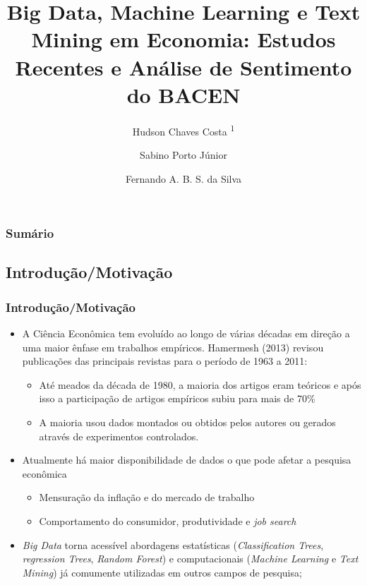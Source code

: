 \documentclass[aspectratio=169]{beamer}
\title[\sc{XVIII EBFin}]{Big Data, Machine Learning e Text Mining em Economia: Estudos Recentes e Análise de Sentimento do BACEN}
\author[FECAP]{Hudson Chaves Costa \textsuperscript{1} \and Sabino Porto Júnior \inst{2} \and Fernando A. B. S. da Silva \inst{3}}
\institute[]{\textsuperscript{1} IBMEC - MG \and \inst{2} Faculdade de Ciências Econômicas - UFRGS \and \inst{3} Instituto de Matemática e Estatística - UFRGS}
\date{}
\begin{document}


\begin{frame}
  \titlepage
\end{frame}

\begin{frame}[plain]\frametitle{Sumário}
\small\tableofcontents
\end{frame}



\subsection{Introdução/Motivação}

\begin{frame}\frametitle{Introdução/Motivação}
  \begin{itemize}
  \item A Ciência Econômica tem evoluído ao longo de várias décadas em direção a uma maior ênfase em trabalhos empíricos. Hamermesh (2013) revisou publicações das principais revistas para o período de 1963 a 2011:
    \begin{itemize}
      \item Até meados da década de 1980, a maioria dos artigos eram teóricos e após isso a participação de artigos empíricos subiu para mais de 70\%
      \item A maioria usou dados montados ou obtidos pelos autores ou gerados através de experimentos controlados.
    \end{itemize}
  \item Atualmente há maior disponibilidade de dados o que pode afetar a pesquisa econômica
    \begin{itemize}
      \item Mensuração da inflação e do mercado de trabalho
      \item Comportamento do consumidor, produtividade e \emph{job search}
    \end{itemize}
  \item \emph{Big Data} torna acessível abordagens estatísticas (\emph{Classification Trees}, \emph{regression Trees}, \emph{Random Forest}) e computacionais (\emph{Machine Learning} e \emph{Text Mining}) já comumente utilizadas em outros campos de pesquisa;
  \end{itemize}
\end{frame}
\end{document}
